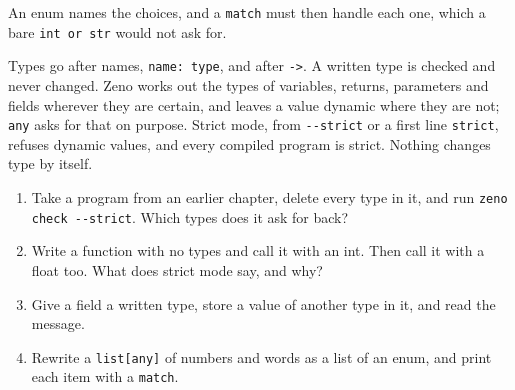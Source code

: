 An enum names the choices, and a \verb|match| must then handle each
one, which a bare \verb|int or str| would not ask for.

\begin{summary}
Types go after names, \verb|name: type|, and after \verb|->|. A written
type is checked and never changed. Zeno works out the types of
variables, returns, parameters and fields wherever they are certain,
and leaves a value dynamic where they are not; \verb|any| asks for that
on purpose. Strict mode, from \verb|--strict| or a first line
\verb|strict|, refuses dynamic values, and every compiled program is
strict. Nothing changes type by itself.
\end{summary}

\begin{tryit}
\begin{enumerate}
\item Take a program from an earlier chapter, delete every type in it,
  and run \verb|zeno check --strict|. Which types does it ask for back?
\item Write a function with no types and call it with an int. Then call
  it with a float too. What does strict mode say, and why?
\item Give a field a written type, store a value of another type in
  it, and read the message.
\item Rewrite a \verb|list[any]| of numbers and words as a list of an
  enum, and print each item with a \verb|match|.
\end{enumerate}
\end{tryit}
